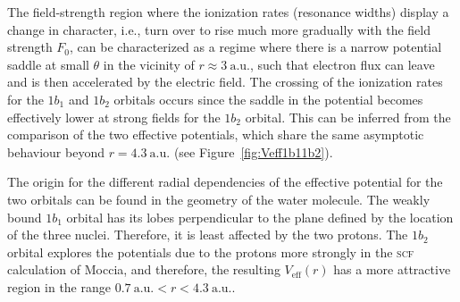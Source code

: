 The field-strength region where the ionization rates (resonance
widths) display a change in character, i.e., turn over to rise much
more gradually with the field strength $F_{0}$, can be characterized
as a regime where there is a narrow potential saddle at small $\theta$
in the vicinity of $r \approx 3\ \mathrm{a.u.}$, such that electron
flux can leave and is then accelerated by the electric field. The
crossing of the ionization rates for the $1b_{1}$ and $1b_{2}$
orbitals occurs since the saddle in the potential becomes effectively
lower at strong fields for the $1b_{2}$ orbital. This can be inferred
from the comparison of the two effective potentials, which share the
same asymptotic behaviour beyond $r = 4.3\ \mathrm{a.u.}$ (see
Figure~\ref{fig:Veff1b11b2}).

The origin for the different radial dependencies of the effective
potential for the two orbitals can be found in the geometry of the
water molecule. The weakly bound $1b_{1}$ orbital has its lobes
perpendicular to the plane defined by the location of the three
nuclei. Therefore, it is least affected by the two protons. The
$1b_{2}$ orbital explores the potentials due to the protons more
strongly in the \textsc{scf} calculation of Moccia, and therefore, the
resulting $V_{\mathrm{eff}}(r)$ has a more attractive region in the
range $0.7\ \mathrm{a.u.} < r < 4.3\ \mathrm{a.u.}$.




